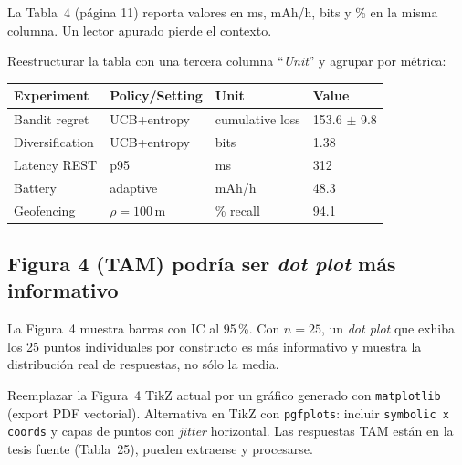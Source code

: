 \documentclass[11pt,a4paper]{article}
\begin{document}
\begin{deficiencia}[m.3 --- Deficiencia]
La Tabla~4 (p\'agina 11) reporta valores en ms, mAh/h, bits y \% en la misma columna. Un lector apurado pierde el contexto.
\end{deficiencia}

\begin{abordaje}
Reestructurar la tabla con una tercera columna ``\emph{Unit}'' y agrupar por m\'etrica:

\begin{small}
\begin{tabular}{@{}llll@{}}
\toprule
Experiment & Policy/Setting & Unit & Value \\
\midrule
Bandit regret & UCB+entropy & cumulative loss & 153.6 $\pm$ 9.8 \\
Diversification & UCB+entropy & bits & 1.38 \\
Latency REST & p95 & ms & 312 \\
Battery & adaptive & mAh/h & 48.3 \\
Geofencing & $\rho=100$\,m & \% recall & 94.1 \\
\bottomrule
\end{tabular}
\end{small}
\end{abordaje}

\subsection{Figura 4 (TAM) podr\'ia ser \emph{dot plot} m\'as informativo}

\begin{deficiencia}[m.4 --- Deficiencia]
La Figura~4 muestra barras con IC al 95\,\%. Con $n=25$, un \emph{dot plot} que exhiba los 25 puntos individuales por constructo es m\'as informativo y muestra la distribuci\'on real de respuestas, no s\'olo la media.
\end{deficiencia}

\begin{abordaje}
Reemplazar la Figura~4 TikZ actual por un gr\'afico generado con \texttt{matplotlib} (export PDF vectorial). Alternativa en TikZ con \texttt{pgfplots}: incluir \texttt{symbolic x coords} y capas de puntos con \emph{jitter} horizontal. Las respuestas TAM est\'an en la tesis fuente (Tabla~25), pueden extraerse y procesarse.
\end{abordaje}
\end{document}
